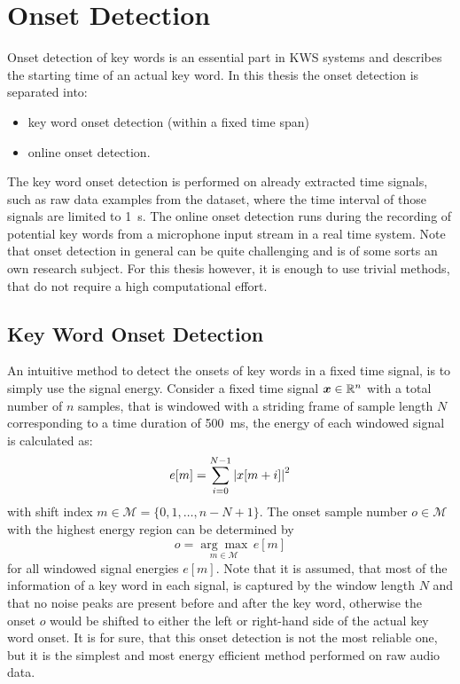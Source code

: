 
\section{Onset Detection}\label{sec:signal_onset}
Onset detection of key words is an essential part in KWS systems and describes the starting time of an actual key word.
In this thesis the onset detection is separated into:
\begin{itemize}
  \item key word onset detection (within a fixed time span)
  \item online onset detection.
\end{itemize}
The key word onset detection is performed on already extracted time signals, such as raw data examples from the dataset, where the time interval of those signals are limited to \SI{1}{\second}.
The online onset detection runs during the recording of potential key words from a microphone input stream in a real time system.
Note that onset detection in general can be quite challenging and is of some sorts an own research subject.
For this thesis however, it is enough to use trivial methods, that do not require a high computational effort.



\subsection{Key Word Onset Detection}\label{sec:signal_onset_kw}
An intuitive method to detect the onsets of key words in a fixed time signal, is to simply use the signal energy.
Consider a fixed time signal $\bm{x} \in \mathbb{R}^n$ with a total number of $n$ samples, that is windowed with a striding frame of sample length $N$ corresponding to a time duration of \SI{500}{\milli\second}, the energy of each windowed signal is calculated as:
\begin{equation}\label{eq:e_win}
  e[m] = \sum_{i=0}^{N-1} \abs{x[m + i]}^2
\end{equation}
with shift index $m \in \mathcal{M} = \{0, 1, \dots, n - N + 1\}$.
The onset sample number $o \in \mathcal{M}$ with the highest energy region can be determined by
\begin{equation}\label{eq:onset}
  o = \underset{m \in \mathcal{M}}{\arg \max} \, e[m]
\end{equation}
for all windowed signal energies $e[m]$.
Note that it is assumed, that most of the information of a key word in each signal, is captured by the window length $N$ and that no noise peaks are present before and after the key word, otherwise the onset $o$ would be shifted to either the left or right-hand side of the actual key word onset.
It is for sure, that this onset detection is not the most reliable one, but it is the simplest and most energy efficient method performed on raw audio data.

